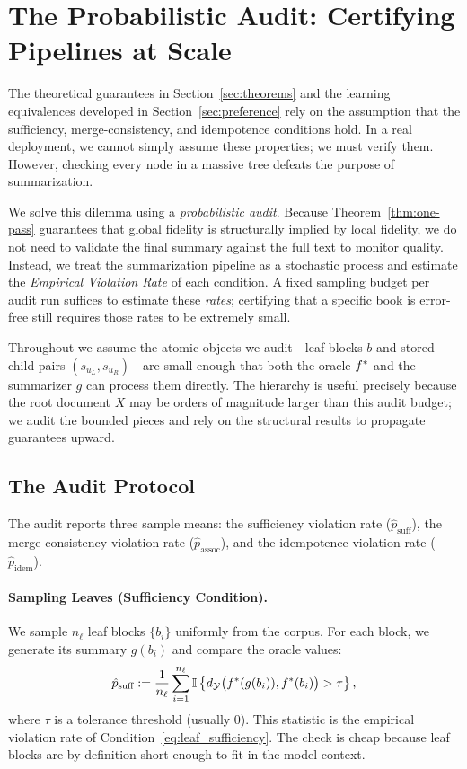 \section{The Probabilistic Audit: Certifying Pipelines at Scale}
\label{sec:audit}

The theoretical guarantees in Section~\ref{sec:theorems} and the learning equivalences developed in Section~\ref{sec:preference} rely on the assumption that the sufficiency, merge-consistency, and idempotence conditions hold. In a real deployment, we cannot simply assume these properties; we must verify them. However, checking every node in a massive tree defeats the purpose of summarization.

We solve this dilemma using a \emph{probabilistic audit}. Because Theorem~\ref{thm:one-pass} guarantees that global fidelity is structurally implied by local fidelity, we do not need to validate the final summary against the full text to monitor quality. Instead, we treat the summarization pipeline as a stochastic process and estimate the \emph{Empirical Violation Rate} of each condition. A fixed sampling budget per audit run suffices to estimate these \emph{rates}; certifying that a specific book is error-free still requires those rates to be extremely small.

Throughout we assume the atomic objects we audit---leaf blocks $b$ and stored child pairs $(s_{u_L},s_{u_R})$---are small enough that both the oracle $f^{\ast}$ and the summarizer $g$ can process them directly. The hierarchy is useful precisely because the root document $X$ may be orders of magnitude larger than this audit budget; we audit the bounded pieces and rely on the structural results to propagate guarantees upward.

\subsection{The Audit Protocol}

The audit reports three sample means: the sufficiency violation rate ($\hat{p}_{\text{suff}}$), the merge-consistency violation rate ($\hat{p}_{\text{assoc}}$), and the idempotence violation rate ($\hat{p}_{\text{idem}}$).

\paragraph{Sampling Leaves (Sufficiency Condition).}
We sample $n_\ell$ leaf blocks $\{b_i\}$ uniformly from the corpus. For each block, we generate its summary $g(b_i)$ and compare the oracle values:
\[
\hat{p}_{\text{suff}} := \frac{1}{n_\ell} \sum_{i=1}^{n_\ell} \mathbb{I}\left\{ d_{\mathcal{Y}}\big(f^{\ast}(g(b_i)), f^{\ast}(b_i)\big) > \tau \right\},
\]
where $\tau$ is a tolerance threshold (usually 0). This statistic is the empirical violation rate of Condition~\eqref{eq:leaf_sufficiency}. The check is cheap because leaf blocks are by definition short enough to fit in the model context.

